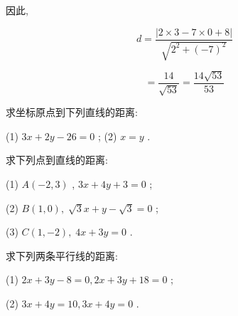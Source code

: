 \documentclass[lang=cn,newtx,10pt,scheme=chinese]{elegantbook}
\begin{document}
因此,

\[
  d = \frac{\left| 2 \times 3 - 7 \times 0 + 8\right| }{\sqrt{{2}^{2} + {\left( -7\right) }^{2}}}
\]

\[
  = \frac{14}{\sqrt{53}} = \frac{{14}\sqrt{53}}{53}
\]

\begin{problemset}[练习]

\item 求坐标原点到下列直线的距离:

(1) \({3x} + {2y} - {26} = 0\) ; (2) \(x = y\) .

\item 求下列点到直线的距离:

(1) \(A\left( {-2,3}\right)\) , \({3x} + {4y} + 3 = 0\) ;

(2) \(B\left( {1,0}\right) ,\;\sqrt{3}x + y - \sqrt{3} = 0\) ;

(3) \(C\left( {1, - 2}\right) ,\;{4x} + {3y} = 0\) .

\item 求下列两条平行线的距离:

(1) \({2x} + {3y} - 8 = 0,{2x} + {3y} + {18} = 0\) ;

(2) \({3x} + {4y} = {10},{3x} + {4y} = 0\) .

\end{problemset}
\end{document}
